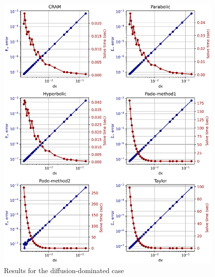 \begin{figure}[p]
    \centering
    \includegraphics[width=5.0in]{images/chapter-5/progressionProblems/problem2/problem2a.png}
    \caption{Results for the diffusion-dominated case}
    \label{fig:problem2_diffusion_dom}
\end{figure}

\clearpage

